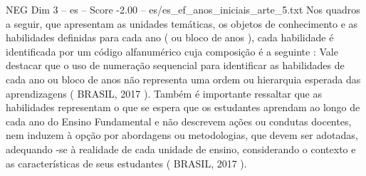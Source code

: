 \begin{textsample}{NEG Dim 3 – es – Score -2.00 – es/es\_ef\_anos\_iniciais\_arte\_5.txt}
Nos quadros a seguir, que apresentam as unidades temáticas, os objetos de conhecimento e as habilidades definidas para cada ano ( ou bloco de anos ), cada habilidade é identificada por um código alfanumérico cuja composição é a seguinte : Vale destacar que o uso de numeração sequencial para identificar as habilidades de cada ano ou bloco de anos não representa uma ordem ou hierarquia esperada das aprendizagens ( BRASIL, 2017 ).
Também é importante ressaltar que as habilidades representam o que se espera que os estudantes aprendam ao longo de cada ano do Ensino Fundamental e não descrevem ações ou condutas docentes, nem induzem à opção por abordagens ou metodologias, que devem ser adotadas, adequando -se à realidade de cada unidade de ensino, considerando o contexto e as características de seus estudantes ( BRASIL, 2017 ).

\end{textsample}
